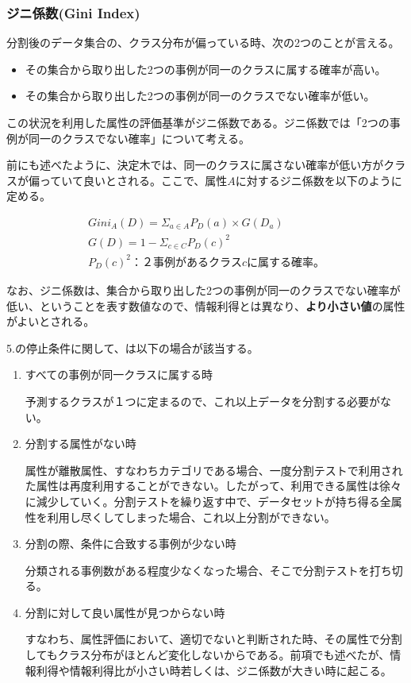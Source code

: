 \documentclass[dvipdfmx]{jsarticle}
\begin{document}
\subsubsection{ジニ係数(Gini Index)}
分割後のデータ集合の、クラス分布が偏っている時、次の2つのことが言える。
\begin{itemize}
  \item その集合から取り出した2つの事例が同一のクラスに属する確率が高い。
  \item その集合から取り出した2つの事例が同一のクラスでない確率が低い。
\end{itemize}
この状況を利用した属性の評価基準がジニ係数である。ジニ係数では「2つの事例が同一のクラスでない確率」について考える。\par
前にも述べたように、決定木では、同一のクラスに属さない確率が低い方がクラスが偏っていて良いとされる。ここで、属性$A$に対するジニ係数を以下のように定める。
\begin{center}
  \begin{align*}
    Gini_{A}(D) = \Sigma_{a \in A}P_{D}(a) \times G(D_{a})　\\
    G(D) = 1 - \Sigma_{c \in C}P_{D}(c)^{2} \\
    P_{D}(c)^{2}：２事例があるクラスcに属する確率。
  \end{align*}
\end{center}
なお、ジニ係数は、集合から取り出した2つの事例が同一のクラスでない確率が低い、ということを表す数値なので、情報利得とは異なり、\textbf{より小さい値}の属性がよいとされる。\par
5.の停止条件に関して、は以下の場合が該当する。
\begin{enumerate}
  \item すべての事例が同一クラスに属する時 \par
  予測するクラスが１つに定まるので、これ以上データを分割する必要がない。
  \item 分割する属性がない時 \par
  属性が離散属性、すなわちカテゴリである場合、一度分割テストで利用された属性は再度利用することができない。したがって、利用できる属性は徐々に減少していく。分割テストを繰り返す中で、データセットが持ち得る全属性を利用し尽くしてしまった場合、これ以上分割ができない。
  \item 分割の際、条件に合致する事例が少ない時 \par
  分類される事例数がある程度少なくなった場合、そこで分割テストを打ち切る。
  \item 分割に対して良い属性が見つからない時 \par
  すなわち、属性評価において、適切でないと判断された時、その属性で分割してもクラス分布がほとんど変化しないからである。前項でも述べたが、情報利得や情報利得比が小さい時若しくは、ジニ係数が大きい時に起こる。
\end{enumerate}
\end{document}
